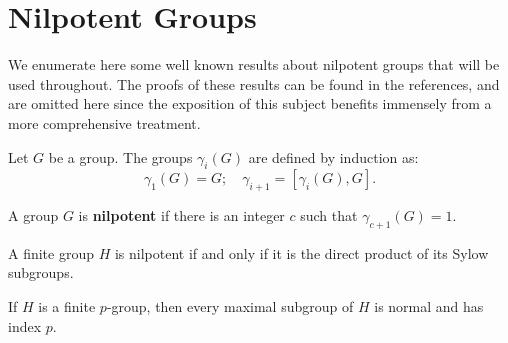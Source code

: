 \pagebreak
\section{Nilpotent Groups}

We enumerate here some well known results about nilpotent groups that will be used throughout. The proofs of these results can be found in the references, and are omitted here since the exposition of this subject benefits immensely from a more comprehensive treatment.

\begin{definition}
    Let $G$ be a group. The groups $\gamma_i(G)$ are defined by induction as:
    $$
    \gamma_1(G) = G; \quad \gamma_{i+1} = \left[\gamma_i(G), G\right].
    $$ 
\end{definition}

\begin{definition}
    A group $G$ is \textbf{nilpotent} if there is an integer $c$ such that $\gamma_{c+1}(G) = 1$. 
\end{definition}

\begin{theorem}
    \cite[p.~116]{RotmanITG}
    A finite group $H$ is nilpotent if and only if it is the direct product of its Sylow subgroups.
\end{theorem}

\begin{theorem}
    \cite[p.~117]{RotmanITG}
    \label{S1NG:maxsub}
    If $H$ is a finite $p$-group, then every maximal subgroup of $H$ is normal and has index $p$.
\end{theorem}

